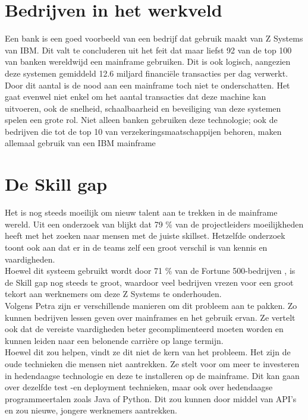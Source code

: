 \section{Bedrijven in het werkveld}
\label{sec:bedrijven-in-werkveld}
Een bank is een goed voorbeeld van een bedrijf dat gebruik maakt van Z Systems van IBM. Dit valt te concluderen uit het feit dat maar liefst 92 van de top 100 van banken wereldwijd een mainframe gebruiken. Dit is ook logisch, aangezien deze systemen gemiddeld 12.6 miljard financiële transacties per dag verwerkt. \autocite{Wagle2017} \\

Door dit aantal is de nood aan een mainframe toch niet te onderschatten. Het gaat evenwel niet enkel om het aantal transacties dat deze machine kan uitvoeren, ook de snelheid, schaalbaarheid en beveiliging van deze systemen spelen een grote rol. Niet alleen banken gebruiken deze technologie; ook de bedrijven die tot de top 10 van verzekeringsmaatschappijen behoren, maken allemaal gebruik van een IBM mainframe \autocite{Tozzi2022}

\section{De Skill gap}
\label{sec:skill-gap}
Het is nog steeds moeilijk om nieuw talent aan te trekken in de mainframe wereld. Uit een onderzoek van  \textcite{Deloitte2020} blijkt dat 79 \% van de projectleiders moeilijkheden heeft met het zoeken naar mensen met de juiste skillset. Hetzelfde onderzoek toont ook aan dat er in de teams zelf een groot verschil is van kennis en vaardigheden.  \\ 

Hoewel dit systeem gebruikt wordt door 71 \% van de Fortune 500-bedrijven \autocite{Tozzi2022} , is de Skill gap nog steeds te groot, waardoor veel bedrijven vrezen voor een groot tekort aan werknemers om deze Z Systems te onderhouden. \\

Volgens Petra \textcite{Goude2023} zijn er verschillende manieren om dit probleem aan te pakken. Zo kunnen bedrijven lessen geven over mainframes en het gebruik ervan. Ze vertelt ook dat de vereiste vaardigheden beter gecomplimenteerd moeten worden en kunnen leiden naar een belonende carrière op lange termijn. \\ Hoewel dit zou helpen, vindt ze dit niet de kern van het probleem. Het zijn de oude technieken die mensen niet aantrekken. Ze stelt voor om meer te investeren in hedendaagse technologie en deze te installeren op de mainframe. Dit kan gaan over dezelfde test -en deployment technieken, maar ook over hedendaagse programmeertalen zoals Java of Python. Dit zou kunnen door middel van API's en zou nieuwe, jongere werknemers aantrekken. 


